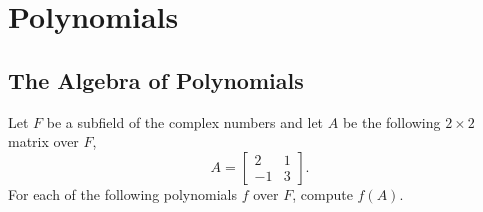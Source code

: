 \chapter{Polynomials}

\skipsection
\section{The Algebra of Polynomials}

 Let $F$ be a subfield of the complex numbers and let $A$ be
the following $2\times2$ matrix over $F$,
\begin{equation*}
  A =
  \begin{bmatrix}
    2 & 1 \\
    -1 & 3
  \end{bmatrix}.
\end{equation*}
For each of the following polynomials $f$ over $F$, compute $f(A)$.
